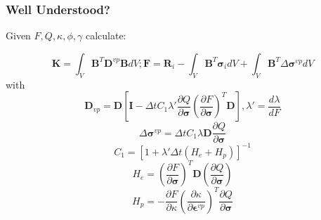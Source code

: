 \documentclass[usenames,dvipsnames,10pt]{beamer}
\makeatletter
\newcommand{\stack}[1]{\begin{tabular}{@{}c@{}}#1\end{tabular}}
\makeatother
\begin{document}
\begin{frame}
  
  \frametitle{Well Understood?}
  
  Given $F, Q, \kappa, \phi, \gamma$ calculate:

  \begin{equation} \label{EqImplicitFEM}
    \mathbf{K} = \int_V \mathbf{B}^T \mathbf{D}^{vp} \mathbf{B} dV; \mathbf{F} = \mathbf{R}_i - \int_V \mathbf{B}^T \bm{\sigma}_i dV + \int_V \mathbf{B}^T
    \Delta
    \bm{\sigma}^{vp} dV
    \end{equation}
    with
    \begin{equation}
    \mathbf{D}_{vp} =
    \mathbf{D} \left [
    \mathbf{I} - {\Delta t} C_1 \lambda' \frac{\partial Q}{\partial \bm{\sigma}} \left ( \frac{\partial F}{\partial
    \bm{\sigma}} \right )^{T} \mathbf{D}
    \right ], \lambda' = \frac{d \lambda}{d F}
    \end{equation}
    \begin{equation}
    \Delta \bm{\sigma}^{vp} = \Delta t C_1 \lambda \mathbf{D} \frac{\partial Q}{\partial \bm{\sigma}}
    \end{equation}
    \begin{equation}
    C_1 = [1 + \lambda' {\Delta t} (H_e + H_p)]^{-1}
    \end{equation}
    \begin{equation}
    \label{HEE}
    H_e = \left ( \frac{\partial F}{\partial \bm{\sigma}} \right )^T \mathbf{D} (\frac{\partial Q}{\partial \bm{\sigma}})
    \end{equation}
    \begin{equation}
    H_p = -\frac{\partial F}{\partial \kappa} \left ( \frac{\partial \kappa}{\partial \bm{\epsilon}^{vp}}
    \right )^T \frac{\partial Q}{\partial \bm{\sigma}}
    \end{equation}
  
\end{frame}
  
{
\addtolength\textwidth{-.4in} 
\setlength\hsize{\textwidth} 
\setlength\columnwidth{\textwidth}
\takahashi{\color{yellow}{\stack{Well\\Understood}}}
}
  
\end{document}
